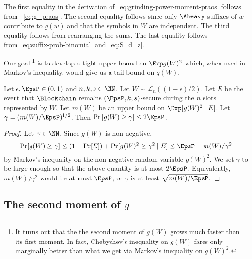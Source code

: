 The first equality in the derivation of~\eqref{eq:grinding-power-moment-praos} follows from 
~\eqref{eq:g_praos}. 
The second equality follows 
since only $\Aheavy$ suffixes of $w$ contribute to $g(w)$ 
and that the symbols in $W$ are independent. 
The third equality follows from rearranging the sums. 
The last equality follows from~\eqref{eq:suffix-prob-binomial} 
and~\eqref{eq:S_d_z}.

Our goal \footnote{
It turns out that the the second moment of $g(W)$ grows 
much faster than its first moment. In fact, 
Chebyshev's inequality on $g(W)$ fares only marginally better 
than what we get via Markov's inequality on $g(W)^2$. 
}
is to develop a tight upper bound on $\Exp g(W)^2$ 
which, when used in Markov's inequality, 
would give us a tail bound on $g(W)$. 

\begin{lemma}\label{lemma:praos-tail-gamma}
  Let $\epsilon, \EpsP \in (0, 1)$ and $n, k, s \in \NN$. 
  Let $W \sim \mathcal{L}_n((1-\epsilon)/2)$.
  Let $E$ be the event that 
  $\Blockchain$ remains $(\EpsP, k, s)$-secure during 
  the $n$ slots represented by $W$. 
  Let $m(W)$ be an upper bound on $\Exp[ g(W)^2 \mid E]$.
  Let $\gamma = (m(W)/\EpsP)^{1/2}$.
  Then 
  $
      \Pr\left[g(W) \geq \gamma\right] \leq 2 \EpsP
  $.
\end{lemma}
\begin{proof}
  Let $\gamma \in \NN$. 
  Since $g(W)$ is non-negative, 
  $$
    \Pr[g(W) \geq \gamma]
    \leq (1 - \Pr[E]) + \Pr[g(W)^2 \geq \gamma^2 \mid E] 
    \leq \EpsP + m(W)/\gamma^2
  $$ 
  by Markov's inequality on the non-negative random variable $g(W)^2$. 
  We set $\gamma$ to be large enough so that the above quantity is at most $2 \EpsP$. 
  Equivalently, 
  $m(W)/\gamma^2$ would be at most $\EpsP$, 
  or $\gamma$ is at least $\sqrt{m(W)/\EpsP}$. 
\end{proof}


\subsection{The second moment of $g$}

